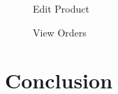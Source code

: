 \documentclass[11pt]{report}
\begin{document}
\begin{figure}[H]
	\caption{Edit Product}
\end{figure}
\begin{figure}[H]
	\caption{View Orders}
\end{figure}
 \chapter{Conclusion}
 \label {con}


 
\end{document}
